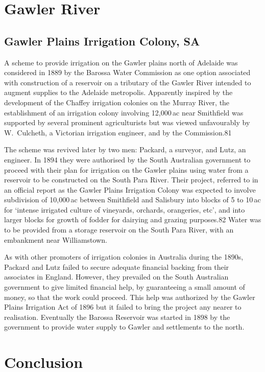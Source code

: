 \section{Gawler River}

\subsection{Gawler Plains Irrigation Colony, SA}

A scheme to provide irrigation on the Gawler plains north of Adelaide
was considered in 1889 by the Barossa Water Commission as one option
associated with construction of a reservoir on a tributary of the
Gawler River intended to augment supplies to the Adelaide metropolis.
Apparently inspired by the development of the Chaffey irrigation
colonies on the Murray River, the establishment of an irrigation
colony involving 12,000\,ac near Smithfield was supported by several
prominent agriculturists but was viewed unfavourably by W.~Culcheth, a
Victorian irrigation engineer, and by the Commission.81

The scheme was revived later by two men: Packard, a surveyor, and
Lutz, an engineer.  In 1894 they were authorised by the South
Australian government to proceed with their plan for irrigation on the
Gawler plains using water from a reservoir to be constructed on the
South Para River.  Their project, referred to in an official report as
the Gawler Plains Irrigation Colony was expected to involve
subdivision of 10,000\,ac between Smithfield and Salisbury into blocks
of 5 to 10\,ac for `intense irrigated culture of vineyards, orchards,
orangeries, etc', and into larger blocks for growth of fodder for
dairying and grazing purposes.82 Water was to be provided from a
storage reservoir on the South Para River, with an embankment near
Williamstown.

As with other promoters of irrigation colonies in Australia during the
1890s, Packard and Lutz failed to secure adequate financial backing
from their associates in England.  However, they prevailed on the
South Australian government to give limited financial help, by
guaranteeing a small amount of money, so that the work could proceed.
This help was authorized by the Gawler Plains Irrigation Act of 1896
but it failed to bring the project any nearer to realisation.
Eventually the Barossa Reservoir was started in 1898 by the government
to provide water supply to Gawler and settlements to the north.

\section{Conclusion}

